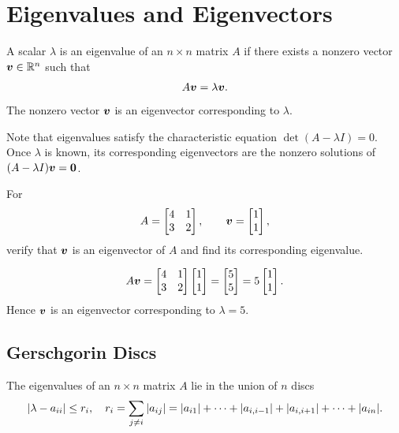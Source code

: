 \section{Eigenvalues and Eigenvectors}

\begin{definition}
A scalar $\lambda$ is an eigenvalue of an $n\times n$ matrix $A$ if there exists a nonzero vector $\boldsymbol{v} \in \mathbb{R}^n$ such that
\[
 A\boldsymbol{v}=\lambda\boldsymbol{v}.
\]
The nonzero vector $\boldsymbol{v}$ is an eigenvector corresponding to $\lambda$.
\end{definition}

\noindent
Note that eigenvalues satisfy the characteristic equation
\(
 \det(A-\lambda I)=0.
\)
Once $\lambda$ is known, its corresponding eigenvectors are the nonzero solutions of
$(A-\lambda I)\boldsymbol{v}=\boldsymbol{0}$.

\begin{example}
For
\[
 A=\begin{bmatrix}4&1\\3&2\end{bmatrix},
 \qquad
 \boldsymbol{v}=\begin{bmatrix}1\\1\end{bmatrix},
\]
verify that $\boldsymbol{v}$ is an eigenvector of $A$ and find its corresponding eigenvalue.
\end{example}

\begin{solution}[2.2cm]
\[
 A\boldsymbol{v}
 =\begin{bmatrix}4&1\\3&2\end{bmatrix}\begin{bmatrix}1\\1\end{bmatrix}
 =\begin{bmatrix}5\\5\end{bmatrix}
 =5\begin{bmatrix}1\\1\end{bmatrix}.
\]
Hence $\boldsymbol{v}$ is an eigenvector corresponding to $\lambda=5$.
\end{solution}

\subsection{Gerschgorin Discs}

\begin{theorem}
The eigenvalues of an $n\times n$ matrix $A$ lie in the union of $n$ discs
\[
 \left\lvert \lambda-a_{ii}\right\rvert\le r_i,
 \quad
 r_i=\sum_{j\ne i}|a_{ij}| = |a_{i1}| + \dots + |a_{i,i-1}| + |a_{i,i+1}| + \dots + |a_{in}|.
\]
\end{theorem}

